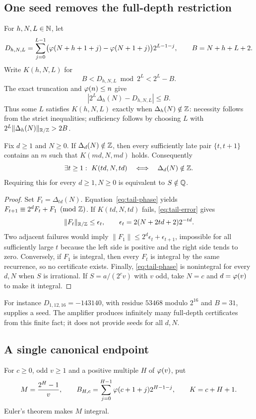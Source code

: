 \documentclass[11pt]{article}
\begin{document}
\subsection{One seed removes the full-depth restriction}
For $h,N,L\in\mathbb{N}$, let
\[
 D_{h,N,L}=\sum_{j=0}^{L-1}
   \bigl(\varphi(N+h+1+j)-\varphi(N+1+j)\bigr)2^{L-1-j},
 \qquad B=N+h+L+2.
\]
Write $K(h,N,L)$ for
\[
 B<D_{h,N,L}\bmod2^L<2^L-B.
\]
The exact truncation and $\varphi(n)\le n$ give
\begin{equation}\label{eq:tail-error}
 |2^L\Delta_h(N)-D_{h,N,L}|\le B.
\end{equation}
Thus some $L$ satisfies $K(h,N,L)$ exactly when $\Delta_h(N)\notin\mathbb{Z}$:
necessity follows from the strict inequalities; sufficiency follows by
choosing $L$ with $2^L\|\Delta_h(N)\|_{\mathbb{R}/\mathbb{Z}}>2B$.

\begin{theorem}\label{res:fulldepth}
Fix $d\ge1$ and $N\ge0$. If $\Delta_d(N)\notin\mathbb{Z}$, then every sufficiently
late pair $\{t,t+1\}$ contains an $m$ such that $K(md,N,md)$ holds.
Consequently
\[
 \exists t\ge1:\ K(td,N,td)
 \quad\Longleftrightarrow\quad\Delta_d(N)\notin\Z.
\]
Requiring this for every $d\ge1,N\ge0$ is equivalent to $S\notin\mathbb{Q}$.
\end{theorem}
\begin{proof}
Set $F_t=\Delta_{td}(N)$. Equation~\eqref{eq:tail-phase} yields
$F_{t+1}\equiv2^dF_t+F_1\pmod{\mathbb{Z}}$. If $K(td,N,td)$ fails,
\eqref{eq:tail-error} gives
\[
 \|F_t\|_{\mathbb{R}/\mathbb{Z}}\le\epsilon_t,
 \qquad \epsilon_t=2(N+2td+2)2^{-td}.
\]
Two adjacent failures would imply
$\|F_1\|\le2^d\epsilon_t+\epsilon_{t+1}$, impossible for all sufficiently
large $t$ because the left side is positive and the right side tends to zero.
Conversely, if $F_1$ is integral, then every $F_t$ is integral by the same
recurrence, so no certificate exists. Finally, \eqref{eq:tail-phase} is
nonintegral for every $d,N$ when $S$ is irrational. If
$S=a/(2^cv)$ with $v$ odd, take $N=c$ and $d=\varphi(v)$ to make it integral.
\end{proof}
For instance $D_{1,12,16}=-143140$, with residue $53468$ modulo $2^{16}$
and $B=31$, supplies a seed. The amplifier produces infinitely many
full-depth certificates from this finite fact; it does not provide seeds
for all $d,N$.

\subsection{A single canonical endpoint}\label{sec:frontier}
For $c\ge0$, odd $v\ge1$ and a positive multiple $H$ of $\varphi(v)$, put
\[
 M=\frac{2^H-1}{v},\qquad
 B_{H,c}=\sum_{j=0}^{H-1}\varphi(c+1+j)2^{H-1-j},\qquad K=c+H+1.
\]
Euler's theorem makes $M$ integral.
\end{document}
